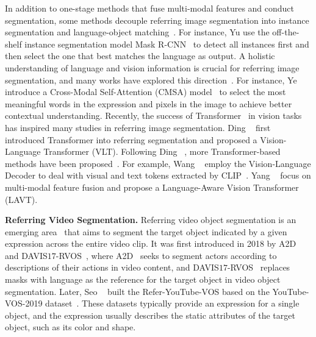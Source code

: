 \documentclass[10pt,twocolumn,letterpaper]{article}
\begin{document}
In addition to one-stage methods that fuse multi-modal features and conduct segmentation, some methods decouple referring image segmentation into instance segmentation and language-object matching~\cite{yu2018mattnet, ISFP, jing2021locate}. For instance, Yu \etal use the off-the-shelf instance segmentation model Mask R-CNN~\cite{he2017mask} to detect all instances first and then select the one that best matches the language as output. A holistic understanding of language and vision information is crucial for referring image segmentation, and many works have explored this direction~\cite{hui2020linguistic,yang2021bottom,ye2019cross}. For instance, Ye \etal introduce a Cross-Modal Self-Attention (CMSA) model~\cite{ye2019cross} to select the most meaningful words in the expression and pixels in the image to achieve better contextual understanding. Recently, the success of Transformer~\cite{vaswani2017attention} in vision tasks has inspired many studies in referring image segmentation. Ding \etal~\cite{vltpami,ding2021vision} first introduced Transformer into referring segmentation and proposed a Vision-Language Transformer (VLT). Following Ding \etal~\cite{vltpami,ding2021vision}, more Transformer-based methods have been proposed~\cite{yang2021lavt, wang2022cris, kim2022restr}. For example, Wang \etal~\cite{wang2022cris} employ the Vision-Language Decoder to deal with visual and text tokens extracted by CLIP~\cite{radford2021learning}. Yang \etal~\cite{yang2021lavt} focus on multi-modal feature fusion and propose a Language-Aware Vision Transformer (LAVT).


\noindent\textbf{Referring Video Segmentation.} Referring video object segmentation is an emerging area~\cite{wang2020context,ningpolar,wang2019asymmetric,mcintosh2020visual,liu2021cmpc,hui2021collaborative,Wu_2022_CVPR,zhao2022modeling,sun2022starting,chen2022multi,yang2022tubedetr,tang2021human} that aims to segment the target object indicated by a given expression across the entire video clip. It was first introduced in 2018 by A2D~\cite{gavrilyuk2018actor} and DAVIS${17}$-RVOS~\cite{khoreva2018video}, where A2D~\cite{gavrilyuk2018actor} seeks to segment actors according to descriptions of their actions in video content, and DAVIS${17}$-RVOS~\cite{khoreva2018video} replaces masks with language as the reference for the target object in video object segmentation. Later, Seo \etal~\cite{seo2020urvos} built the Refer-YouTube-VOS based on the YouTube-VOS-2019 dataset~\cite{xu2018youtube}. These datasets typically provide an expression for a single object, and the expression usually describes the static attributes of the target object, such as its color and shape.
\end{document}

